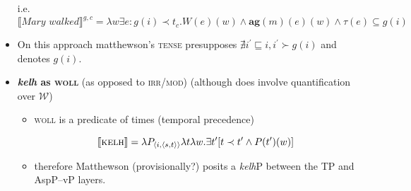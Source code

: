 \documentclass[10pt]{article}
\begin{document}
\begin{itemize}
	i.e. $\llbracket\textit{Mary walked}\rrbracket^{g,c}=\lambda w\exists e:g(i)\prec t_c.W(e)(w)\wedge\textbf{ag}(m)(e)(w)\wedge\tau(e)\subseteq g(i)$
	\item On this approach matthewson's \textsc{tense} presupposes $\nexists i^\prime\sqsubseteq i,i^\prime \succ g(i)$ and denotes $g(i)$.
	\item \textbf{\textit{kelh} as \textsc{woll}} (as opposed to \textsc{irr/\textsc{mod}}) (although does involve quantification over $\mathcal W$)
	\begin{itemize}
		\item \textsc{woll} is a predicate of times (temporal precedence)
		
		$$\llbracket\textsc{kelh}\rrbracket=\lambda P_{\langle i,\langle s,t\rangle\rangle}\lambda t\lambda w.\exists t^\prime[t\prec t^\prime\wedge P(t^\prime)(w)] $$
		\item therefore Matthewson (provisionally?) posits a \textit{kelh}P between the TP and AspP--vP layers.
		

\end{itemize}
\end{itemize}
\end{document}
